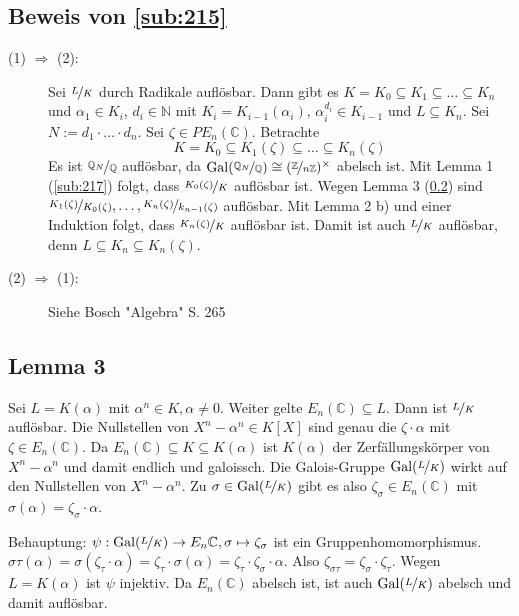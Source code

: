 \subsection{Beweis von \ref{sub:215}} %
\label{sub:219}
\begin{description}
	\item[(1) $\Rightarrow$ (2):] Sei $\nicefrac{L}{K}$ durch Radikale auflösbar. Dann gibt es $K=K_0 \subseteq K_1 \subseteq \ldots \subseteq K_n$ und $\alpha_1 \in K_i$,
	$d_i \in \mathds{N}$ mit $K_i = K_{i-1}(\alpha_i)$, $\alpha_i^{d_i} \in K_{i-1}$ und $L \subseteq K_n$. Sei $N:= d_1 \cdot \ldots \cdot d_n$. Sei 
	$\zeta \in PE_n(\mathds{C})$. Betrachte 
	\[
		K = K_0 \subseteq K_1(\zeta) \subseteq \ldots \subseteq K_n(\zeta)
	\]
	Es ist $\nicefrac{\mathds{Q}_N}{\mathds{Q}}$ auflösbar, da $\Gal(\nicefrac{\mathds{Q}_N}{\mathds{Q}}) \cong \enbrace{\nicefrac{\mathds{Z}}{n \mathds{Z}}}^\times $
	abelsch ist. Mit Lemma 1 (\ref{sub:217}) folgt, dass $\nicefrac{K_0(\zeta)}{K}$ auflösbar ist. Wegen Lemma 3 (\ref{sub:2110}) sind 
	$\nicefrac{K_1(\zeta)}{K_0(\zeta)}, \ldots , \nicefrac{K_n(\zeta)}{k_{n-1}(\zeta)}$ auflösbar. Mit Lemma 2 b) und einer Induktion folgt, dass
	$\nicefrac{K_n(\zeta)}{K}$ auflösbar ist. Damit ist auch $\nicefrac{L}{K}$ auflösbar, denn $L \subseteq K_n \subseteq K_n(\zeta)$. \bewende
	\item[(2) $\Rightarrow $ (1):] Siehe Bosch "{}Algebra"{} S. 265
\end{description}

\subsection[Lemma 3: Auflösbarkeit einer Radikalerweiterung, die alle Einheitswurzeln enthält]{Lemma 3} %
\label{sub:2110}
Sei $L=K(\alpha)$ mit $\alpha^n \in K, \alpha \not= 0$. Weiter gelte $E_n(\mathds{C}) \subseteq L$. Dann ist $\nicefrac{L}{K}$ auflösbar.
Die Nullstellen von $X^n- \alpha^n \in K[X]$ sind genau die $\zeta \cdot \alpha$ mit $\zeta \in E_n(\mathds{C})$. Da $E_n(\mathds{C}) \subseteq K \subseteq K(\alpha)$ ist
$K(\alpha)$ der Zerfällungskörper von $X^n-\alpha^n$ und damit endlich und galoissch. Die Galois-Gruppe $\Gal(\nicefrac{L}{K})$ wirkt auf den Nullstellen von 
$X^n-\alpha^n$. Zu $\sigma \in \Gal(\nicefrac{L}{K})$ gibt es also $\zeta_\sigma \in E_n(\mathds{C})$ mit $\sigma(\alpha) = \zeta_\sigma \cdot \alpha$.

Behauptung: $\psi : \Gal(\nicefrac{L}{K}) \to E_n{\mathds{C}}, \sigma \mapsto \zeta_\sigma$ ist ein Gruppenhomomorphismus.\\
$\sigma \tau (\alpha) = \sigma( \zeta_\tau \cdot  \alpha) = \zeta_\tau \cdot \sigma(\alpha) = \zeta_\tau \cdot  \zeta_\sigma  \cdot \alpha$. Also $\zeta_{\sigma \tau} = \zeta_\sigma\cdot \zeta_\tau$.
Wegen $L=K(\alpha)$ ist $\psi$ injektiv. Da $E_n(\mathds{C})$ abelsch ist, ist auch $\Gal(\nicefrac{L}{K})$ abelsch und damit auflösbar. \bewende
\newpage

